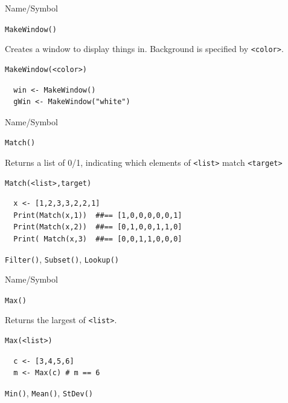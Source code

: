 \begin{desc}{Name/Symbol}
\item[Name/Symbol]	\verb+MakeWindow()+ 

\item[Description]	Creates a window to display things in.
		Background is specified by \verb+<color>+.

\item[Usage]		
\begin{verbatim}
MakeWindow(<color>)
\end{verbatim}

\item[Example]
\begin{verbatim}	
  win <- MakeWindow()
  gWin <- MakeWindow("white")
\end{verbatim}
    
\item[See Also]	
\end{desc}



\begin{desc}{Name/Symbol}
\item[Name/Symbol]	\verb+Match()+            

\item[Description] Returns a list of 0/1, indicating which elements of  \verb+<list>+ match \verb+<target>+

\item[Usage]		
\begin{verbatim}
Match(<list>,target)
\end{verbatim}

\item[Example]	
\begin{verbatim} 
  x <- [1,2,3,3,2,2,1]
  Print(Match(x,1))  ##== [1,0,0,0,0,0,1]
  Print(Match(x,2))  ##== [0,1,0,0,1,1,0]
  Print( Match(x,3)  ##== [0,0,1,1,0,0,0]

\end{verbatim}

\item[See Also]	\verb+Filter()+, \verb+Subset()+, \verb+Lookup()+
\end{desc}



\begin{desc}{Name/Symbol}
\item[Name/Symbol]	\verb+Max()+            

\item[Description] Returns the largest of \verb+<list>+.

\item[Usage]		
\begin{verbatim}
Max(<list>)
\end{verbatim}

\item[Example]	
\begin{verbatim} 
  c <- [3,4,5,6]
  m <- Max(c) # m == 6
\end{verbatim}

\item[See Also]	\verb+Min()+, \verb+Mean()+, \verb+StDev()+
\end{desc}




